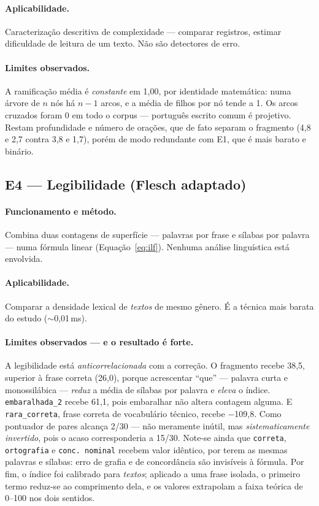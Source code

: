 \documentclass[11pt,a4paper]{article}
\begin{document}
\paragraph{Aplicabilidade.} Caracterização descritiva de complexidade --- comparar registros,
estimar dificuldade de leitura de um texto. Não são detectores de erro.

\paragraph{Limites observados.} A ramificação média é \emph{constante} em 1,00, por identidade
matemática: numa árvore de $n$ nós há $n-1$ arcos, e a média de filhos por nó tende a 1. Os arcos
cruzados foram 0 em todo o corpus --- português escrito comum é projetivo. Restam profundidade e
número de orações, que de fato separam o fragmento (4,8 e 2,7 contra 3,8 e 1,7), porém de modo
redundante com E1, que é mais barato e binário.

\subsection{E4 --- Legibilidade (Flesch adaptado)}

\paragraph{Funcionamento e método.} Combina duas contagens de superfície --- palavras por frase e
sílabas por palavra --- numa fórmula linear (Equação~\ref{eq:ilf}). Nenhuma análise linguística está
envolvida.

\paragraph{Aplicabilidade.} Comparar a densidade lexical de \emph{textos} de mesmo gênero. É a
técnica mais barata do estudo ($\sim$0,01\,ms).

\paragraph{Limites observados --- e o resultado é forte.} A legibilidade está \emph{anticorrelacionada}
com a correção. O fragmento recebe 38,5, superior à frase correta (26,0), porque acrescentar
``que'' --- palavra curta e monossilábica --- \emph{reduz} a média de sílabas por palavra e
\emph{eleva} o índice. \texttt{embaralhada\_2} recebe 61,1, pois embaralhar não altera contagem
alguma. E \texttt{rara\_correta}, frase correta de vocabulário técnico, recebe $-$109,8. Como
pontuador de pares alcança 2/30 --- não meramente inútil, mas \emph{sistematicamente invertido},
pois o acaso corresponderia a 15/30. Note-se ainda que \texttt{correta}, \texttt{ortografia} e
\texttt{conc.\ nominal} recebem valor idêntico, por terem as mesmas palavras e sílabas: erro de
grafia e de concordância são invisíveis à fórmula. Por fim, o índice foi calibrado para
\emph{textos}; aplicado a uma frase isolada, o primeiro termo reduz-se ao comprimento dela, e os
valores extrapolam a faixa teórica de 0--100 nos dois sentidos.
\end{document}
